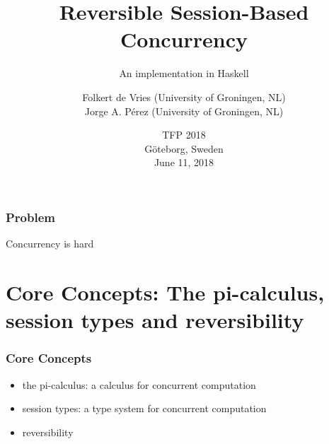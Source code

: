 \documentclass[12pt]{beamer}
\institute{University of Groningen, The Netherlands, \\ \texttt{}}
\title[Reversible Session-Based Concurrency]{Reversible Session-Based Concurrency}
\subtitle{An implementation in Haskell}
\author[de Vries \& P\'{e}rez]{Folkert de Vries (University of Groningen, NL)\\ 	
Jorge A. P\'{e}rez  (University of Groningen, NL)}
\date[June 11, 2018]
{
TFP 2018\\ G\"{o}teborg, Sweden
\\
June 11, 2018
}
\begin{document}
%
%
%


\begin{frame}

\begin{center}
\maketitle
\end{center}

\end{frame}


\begin{frame}
\frametitle{Problem}
\begin{center}

    \LARGE{Concurrency is hard}




\end{center}
\end{frame}


\section{Core Concepts: The pi-calculus, session types and reversibility}


\begin{frame}
\frametitle{Core Concepts}
\begin{center}


\begin{itemize}
    \item the pi-calculus: a calculus for concurrent computation
    \item session types: a type system for concurrent computation
    \item reversibility
\end{itemize}


\end{center}
\end{frame}
\end{document}
